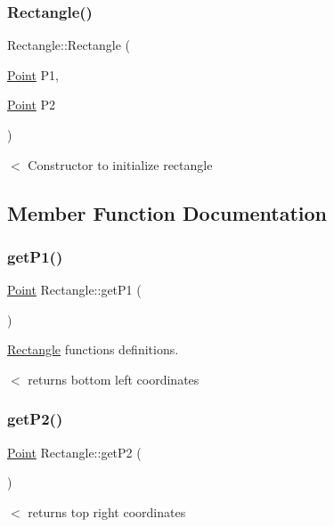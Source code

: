\subsubsection{\texorpdfstring{Rectangle()}{Rectangle()}}
{\footnotesize\ttfamily Rectangle\+::\+Rectangle (\begin{DoxyParamCaption}\item[{\hyperlink{classPoint}{Point}}]{P1,  }\item[{\hyperlink{classPoint}{Point}}]{P2 }\end{DoxyParamCaption})}

$<$ Constructor to initialize rectangle 

\subsection{Member Function Documentation}
\mbox{\label{classRectangle_af5921ae0f9a77de0c2c997de12ea455c}} 
\subsubsection{\texorpdfstring{get\+P1()}{getP1()}}
{\footnotesize\ttfamily \hyperlink{classPoint}{Point} Rectangle\+::get\+P1 (\begin{DoxyParamCaption}{ }\end{DoxyParamCaption})}



\hyperlink{classRectangle}{Rectangle} functions definitions. 

$<$ returns bottom left coordinates \mbox{\label{classRectangle_a1d4d588ff110b227eda59faa2e95aa27}} 
\subsubsection{\texorpdfstring{get\+P2()}{getP2()}}
{\footnotesize\ttfamily \hyperlink{classPoint}{Point} Rectangle\+::get\+P2 (\begin{DoxyParamCaption}{ }\end{DoxyParamCaption})}

$<$ returns top right coordinates \mbox{\label{classRectangle_a6c1286b0633817ee5b9b3fd5395c97b1}} 
